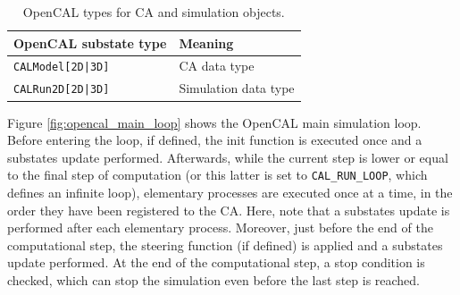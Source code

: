 \begin{table}
  \centering
  \begin{tabular}{l|l}
    \hline
    OpenCAL substate type & Meaning \\
    \hline
    \verb'CALModel[2D|3D]' & CA data type\\
    \verb'CALRun2D[2D|3D]' & Simulation data type\\
    \hline
  \end{tabular}
  \caption{OpenCAL types for CA and simulation objects.}
  \label{tab:ca_sim_types}
\end{table}


Figure \ref{fig:opencal_main_loop} shows the OpenCAL main simulation
loop. Before entering the loop, if defined, the init function is
executed once and a substates update performed. Afterwards, while the
current step is lower or equal to the final step of computation (or
this latter is set to \verb'CAL_RUN_LOOP', which defines an infinite
loop), elementary processes are executed once at a time, in the order
they have been registered to the CA. Here, note that a substates
update is performed after each elementary process. Moreover, just
before the end of the computational step, the steering function (if
defined) is applied and a substates update performed. At the end of
the computational step, a stop condition is checked, which can stop
the simulation even before the last step is reached.


